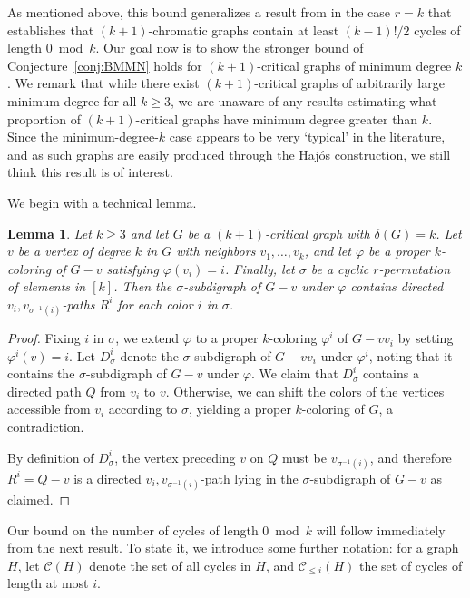 \documentclass[12pt]{article}
\numberwithin{theorem}{section}
\newtheorem{lem}[theorem]{Lemma}
\begin{document}
As mentioned above, this bound generalizes a result from \cite{BMMN} in the case $r=k$ that establishes that $(k+1)$-chromatic graphs contain at least $(k-1)!/2$ cycles of length $0\bmod k$.  Our goal now is to show the stronger bound of Conjecture~\ref{conj:BMMN} holds for $(k+1)$-critical graphs of minimum degree $k$. We remark that while there exist $(k+1)$-critical graphs of arbitrarily large minimum degree for all $k \ge 3$, we are unaware of any results estimating what proportion of $(k+1)$-critical graphs have minimum degree greater than $k$.  Since the minimum-degree-$k$ case appears to be very `typical' in the literature, and as such graphs are easily produced through the Haj\'os construction, we still think this result is of interest.

We begin with a technical lemma.


\begin{lem}
\label{lem:technical}
    Let $k \ge 3$ and let $G$ be a $(k+1)$-critical graph with $\delta(G)=k$. Let $v$ be a vertex of degree $k$ in $G$ with neighbors $v_1,\ldots,v_k$, and let $\varphi$ be a proper $k$-coloring of $G-v$ satisfying $\varphi(v_i)=i$.  Finally, let $\sigma$ be a cyclic $r$-permutation of elements in $[k]$.  Then the $\sigma$-subdigraph of $G-v$ under $\varphi$ contains directed $v_i,v_{\sigma^{-1}(i)}$-paths $R^i$ for each color $i$ in $\sigma$.
\end{lem}

\begin{proof}
     Fixing $i$ in $\sigma$, we extend $\varphi$ to a proper $k$-coloring $\varphi^i$ of $G-vv_i$ by setting $\varphi^i(v)=i$. Let $D^i_{\sigma}$ denote the $\sigma$-subdigraph of $G-vv_i$ under $\varphi^i$, noting that it contains the $\sigma$-subdigraph of $G-v$ under $\varphi$. We claim that $D_{\sigma}^i$ contains a directed path $Q$ from $v_i$ to $v$. Otherwise, we can shift the colors of the vertices accessible from $v_i$ according to $\sigma$, yielding a proper $k$-coloring of $G$, a contradiction.

     By definition of $D_{\sigma}^i$, the vertex preceding $v$ on $Q$ must be $v_{\sigma^{-1}(i)}$, and therefore $R^i=Q-v$ is a directed $v_i,v_{\sigma^{-1}(i)}$-path lying in the $\sigma$-subdigraph of $G-v$ as claimed.
\end{proof}

Our bound on the number of cycles of length $0 \bmod k$ will follow immediately from the next result.  To state it, we introduce some further notation: for a graph $H$, let $\mathcal{C}(H)$ denote the set of all cycles in $H$, and $\mathcal{C}_{\le i}(H)$ the set of cycles of length at most $i$.
\end{document}
